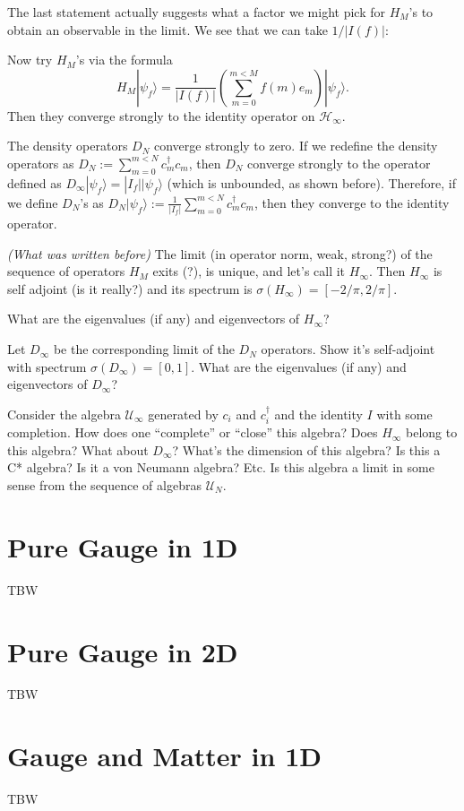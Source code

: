 The last statement actually suggests what a factor we might pick for $H_{M}$'s to obtain an observable in the limit. We see that we can take $1/|I(f)|$:
\begin{statement}
Now try $H_M$'s via the formula
\[
H_M|\psi_f\rangle = \frac{1}{|I(f)|} \left(\sum_{m=0}^{m < M} f(m)e_m\right)|\psi_f\rangle.
\]
Then they converge strongly to the identity operator on $\mathcal H_{\infty}$.
\end{statement}
\begin{statement}
The density operators $D_N$ converge strongly to zero. If we redefine the density operators as $D_N := \sum_{m=0}^{m < N} c_m^\dagger c_m$, then $D_N$ converge strongly to the operator defined as $D_{\infty}|\psi_f\rangle = |I_f||\psi_f\rangle$ (which is unbounded, as shown before). Therefore, if we define $D_{N}$'s as $D_{N}|\psi_f\rangle := \frac{1}{|I_f|}\sum_{m=0}^{m < N} c_m^\dagger c_m$, then they converge to the identity operator.
\end{statement}

\emph{(What was written before) }The limit (in operator norm, weak, strong?) of the sequence of operators $H_M$ exits (?), is unique, and let's call it $H_\infty$.
 	 	Then $H_\infty$ is self adjoint (is it really?) and its spectrum is $\sigma(H_\infty) = [-2/\pi, 2/\pi]$.
 	 	
 	 	What are the eigenvalues (if any) and eigenvectors of $H_\infty$?
 	 	
 	 	Let $D_\infty$ be the corresponding limit of the $D_N$ operators. Show it's self-adjoint with spectrum $\sigma(D_\infty) = [0, 1]$.
 	 	What are the eigenvalues (if any) and eigenvectors of $D_\infty$?
 	 	
 	 Consider the algebra $\mathcal{U}_\infty$ generated by $c_i$ and $c^\dagger_i$ and the identity $I$ with some completion.
 	 How does one ``complete'' or ``close'' this algebra?
 	 Does $H_\infty$ belong to this algebra? What about $D_\infty$?
 	 What's the dimension of this algebra? Is this a C* algebra? Is it a von Neumann algebra? Etc.
 	 Is this algebra a limit in some sense from the sequence of algebras $\mathcal{U}_N$.
	\section{Pure Gauge in 1D}
TBW
	
	\section{Pure Gauge in 2D}
	TBW
	\section{Gauge and Matter in 1D}
	TBW
	
	
